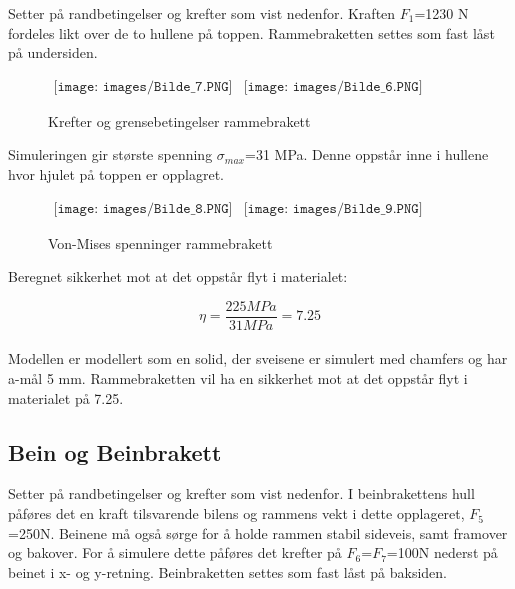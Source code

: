 Setter på randbetingelser og krefter som vist nedenfor. Kraften $F_{1}$=1230 N fordeles likt over de to hullene på toppen. Rammebraketten settes som fast låst på undersiden.

\begin{figure}[H]
\begin{center}$
\begin{array}{ccc}
\texttt{[image: images/Bilde\_7.PNG]} &
\texttt{[image: images/Bilde\_6.PNG]} &  
\end{array}$
\end{center}
\caption{Krefter og grensebetingelser rammebrakett}
\end{figure}

Simuleringen gir største spenning $\sigma_{max}$=31 MPa. Denne oppstår inne i hullene hvor hjulet på toppen er opplagret.

\begin{figure}[H]
\begin{center}$
\begin{array}{ccc}
\texttt{[image: images/Bilde\_8.PNG]} &
\texttt{[image: images/Bilde\_9.PNG]} &  
\end{array}$
\end{center}
\caption{Von-Mises spenninger rammebrakett}
\end{figure}

Beregnet sikkerhet mot at det oppstår flyt i materialet:

\begin{equation}
\eta=\frac{225 MPa}{31 MPa}=7.25
\end{equation}\\

Modellen er modellert som en solid, der sveisene er simulert med chamfers og har a-mål 5 mm.\newline
Rammebraketten vil ha en sikkerhet mot at det oppstår flyt i materialet på 7.25.


\subsection{Bein og Beinbrakett}
Setter på randbetingelser og krefter som vist nedenfor. I beinbrakettens hull påføres det en kraft tilsvarende bilens og rammens vekt i dette opplageret, $F_{5}$=250N. Beinene må også sørge for å holde rammen stabil sideveis, samt framover og bakover. For å simulere dette påføres det krefter på $F_{6}$=$F_{7}$=100N nederst på beinet i x- og y-retning. Beinbraketten settes som fast låst på baksiden.

